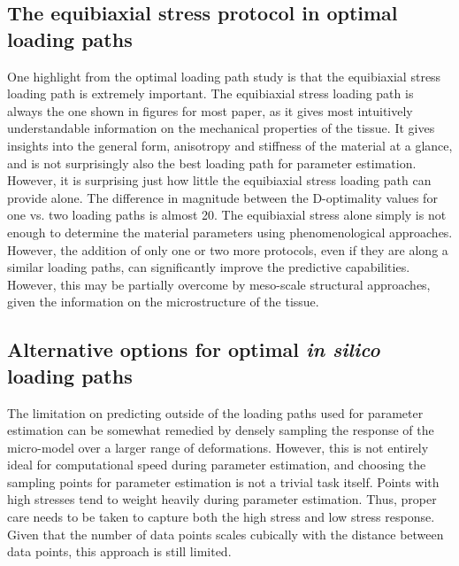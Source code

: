     
    
    
\subsection{The equibiaxial stress protocol in optimal loading paths}

    One highlight from the optimal loading path study is that the equibiaxial stress loading path is extremely important. The equibiaxial stress loading path is always the one shown in figures for most paper, as it gives most intuitively understandable information on the mechanical properties of the tissue. It gives insights into the general form, anisotropy and stiffness of the material at a glance, and is not surprisingly also the best loading path for parameter estimation. However, it is surprising just how little the equibiaxial stress loading path can provide alone. The difference in magnitude between the D-optimality values for one vs. two loading paths is almost 20. The equibiaxial stress alone simply is not enough to determine the material parameters using phenomenological approaches. However, the addition of only one or two more protocols, even if they are along a similar loading paths, can significantly improve the predictive capabilities. However, this may be partially overcome by meso-scale structural approaches, given the information on the microstructure of the tissue.


\subsection{Alternative options for optimal \textit{in silico} loading paths}

	The limitation on predicting outside of the loading paths used for parameter estimation can be somewhat remedied by densely sampling the response of the micro-model over a larger range of deformations. However, this is not entirely ideal for computational speed during parameter estimation, and choosing the sampling points for parameter estimation is not a trivial task itself. Points with high stresses tend to weight heavily during parameter estimation. Thus, proper care needs to be taken to capture both the high stress and low stress response. Given that the number of data points scales cubically with the distance between data points, this approach is still limited. 

